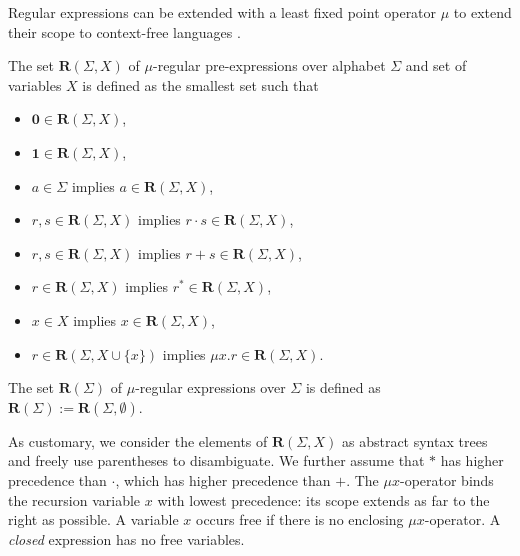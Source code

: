 \documentclass[runningheads, envcountsame, a4paper]{llncs}
\newcommand\Rnull{\mathbf0}
\newcommand\Rempty{\mathbf1}
\newcommand\Reg{\mathbf{R}}
\begin{document}
Regular expressions can be extended with a least fixed point operator
$\mu$ to extend their scope to context-free languages
\cite{DBLP:conf/csl/Leiss91}. 

\begin{definition}\label{def:regular-expression}
  The set $\Reg (\Sigma, X)$ of $\mu$-regular pre-expressions over alphabet
  $\Sigma$ and set of variables $X$ is defined as the smallest set such that
  \begin{itemize}
  \item $\Rnull \in \Reg (\Sigma, X)$,
  \item $\Rempty \in \Reg (\Sigma, X)$,
  \item $a\in \Sigma$ implies $a \in \Reg (\Sigma, X)$,
  \item $r, s \in \Reg (\Sigma, X)$ implies $r \cdot  s\in \Reg (\Sigma, X)$,
  \item $r,s \in \Reg (\Sigma, X)$ implies $r+s \in \Reg (\Sigma, X)$,
  \item $r \in \Reg (\Sigma, X)$ implies $r^*\in \Reg (\Sigma, X)$,
  \item $x \in X$ implies $x \in \Reg (\Sigma, X)$,
  \item $r \in \Reg (\Sigma, X \cup \{x\})$ implies $\mu x.r \in \Reg
    (\Sigma, X)$. 
  \end{itemize}

  The set $\Reg (\Sigma)$ of $\mu$-regular expressions over $\Sigma$ is
  defined as  $\Reg (\Sigma) := \Reg (\Sigma, \emptyset)$.
\end{definition}
As customary, we consider the elements of $\Reg (\Sigma,X)$ as abstract syntax trees and freely use
parentheses to disambiguate. We further assume that $*$ 
has higher precedence than $\cdot$, which has higher precedence than
$+$. The $\mu x$-operator binds the recursion variable $x$ with lowest precedence: its scope
extends as far to the right as possible. A variable $x$ occurs free if
there is no enclosing $\mu x$-operator.  A
\emph{closed} expression has no free variables.
\end{document}
